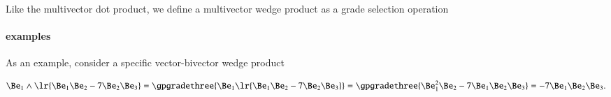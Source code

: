 %
%
Like the multivector dot product, we define a multivector wedge product as a grade selection operation


\paragraph{examples}

%
%
%
%
%
%
As an example, consider a specific vector-bivector wedge product

\begin{dmath}\label{eqn:generalizedWedge:540}
\Be_1 \wedge \lr{ \Be_1 \Be_2 - 7 \Be_2 \Be_3 }
=
\gpgradethree{
\Be_1 \lr{ \Be_1 \Be_2 - 7 \Be_2 \Be_3 }
}
=
\gpgradethree{
\Be_1^2 \Be_2 - 7 \Be_1 \Be_2 \Be_3
}
=
- 7 \Be_1 \Be_2 \Be_3.
\end{dmath}

